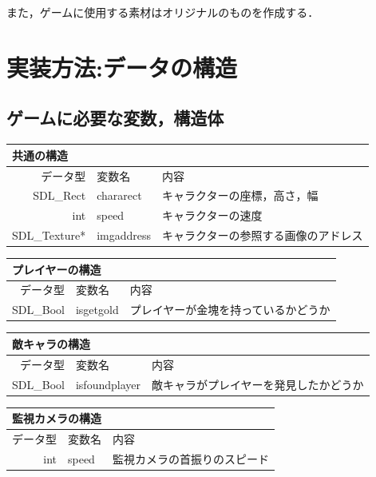 \documentclass{jarticle}
\begin{document}
また，ゲームに使用する素材はオリジナルのものを作成する．

\section{実装方法:データの構造}
\subsection{ゲームに必要な変数，構造体}

\begin{table}[H]
\begin{tabular}{|r|l|l|}
\hline
\multicolumn{3}{|l|}{共通の構造}       \\ \hline
データ型           & 変数名  	& 内容        \\ \hline
SDL\_Rect            & chararect & キャラクターの座標，高さ，幅  \\
int & speed   & キャラクターの速度 \\
SDL\_Texture*					 & imgaddress	& キャラクターの参照する画像のアドレス \\ \hline
\end{tabular}
\end{table}

\begin{table}[H]
\begin{tabular}{|r|l|l|}
\hline
\multicolumn{3}{|l|}{プレイヤーの構造}       \\ \hline
データ型           & 変数名  	& 内容        \\ \hline
SDL\_Bool		&	isgetgold	& プレイヤーが金塊を持っているかどうか\\ \hline
\end{tabular}
\end{table}

\begin{table}[H]
\begin{tabular}{|r|l|l|}
\hline
\multicolumn{3}{|l|}{敵キャラの構造}       \\ \hline
データ型           & 変数名  	& 内容        \\ \hline
SDL\_Bool		&	isfoundplayer	& 敵キャラがプレイヤーを発見したかどうか\\ \hline
\end{tabular}
\end{table}

\begin{table}[H]
\begin{tabular}{|r|l|l|}
\hline
\multicolumn{3}{|l|}{監視カメラの構造}       \\ \hline
データ型           & 変数名  	& 内容        \\ \hline
int		&	speed	& 監視カメラの首振りのスピード\\ \hline
\end{tabular}
\end{table}
\end{document}
